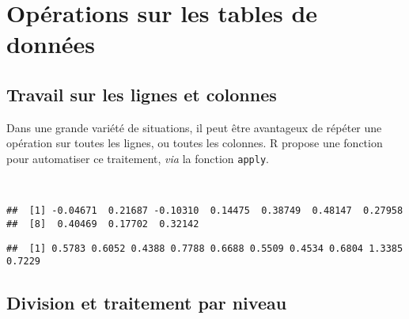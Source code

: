 \chapter{Opérations sur les tables de données\label{c:tables}}

\section{Travail sur les lignes et colonnes}

Dans une grande variété de situations, il peut être avantageux de répéter une opération sur toutes les lignes, ou toutes les colonnes.
R propose une fonction pour automatiser ce traitement, \emph{via} la fonction \texttt{apply}. 

\begin{knitrout}
\color{fgcolor}\begin{kframe}
\begin{flushleft}
\ttfamily\noindent
{}\hlassignement{\usebox{\hlnormalsizeboxlessthan}-}{\ }\hlkeyword{(}\hlkeyword{(}\hlkeyword{)}\hlkeyword{,}{\ }\hlargument{=}{\ }\hlkeyword{)}\hspace*{\fill}\\
\hlstd{}\hlkeyword{(}\hlkeyword{,}{\ }\hlkeyword{,}{\ }\hlkeyword{)}\mbox{}
\normalfont
\end{flushleft}
\begin{verbatim}
##  [1] -0.04671  0.21687 -0.10310  0.14475  0.38749  0.48147  0.27958
##  [8]  0.40469  0.17702  0.32142
\end{verbatim}
\begin{flushleft}
\ttfamily\noindent
{}\hlkeyword{(}\hlkeyword{,}{\ }\hlkeyword{,}{\ }\hlkeyword{)}\mbox{}
\normalfont
\end{flushleft}
\begin{verbatim}
##  [1] 0.5783 0.6052 0.4388 0.7788 0.6688 0.5509 0.4534 0.6804 1.3385 0.7229
\end{verbatim}
\end{kframe}
\end{knitrout}


\section{Division et traitement par niveau}

